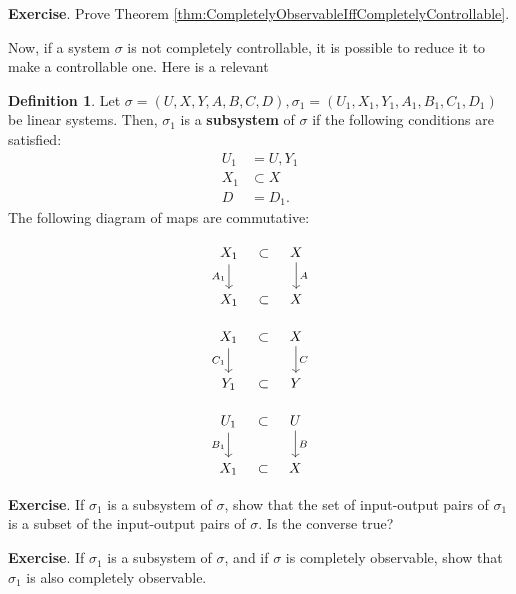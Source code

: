 \documentclass[12pt]{book}
\theoremstyle{plain}
\theoremstyle{definition}
\newtheorem{definition}{Definition}[section]
\begin{document}
\textbf{Exercise}.
Prove Theorem \ref{thm:CompletelyObservableIffCompletelyControllable}.

Now, if a system $\sigma$ is not completely controllable, it is possible to reduce it to make a controllable one.
Here is a relevant

\begin{definition}
    Let $\sigma = (U, X, Y, A, B, C, D), \sigma_1 = (U_1, X_1, Y_1, A_1, B_1, C_1, D_1)$ be linear systems.
    Then, $\sigma_1$ is a \textbf{subsystem} of $\sigma$ if the following conditions are satisfied:
    \begin{align}
        U_1 &= U, Y_1 \\
        X_1 &\subset X \\
        D &= D_1.
    \end{align}
    The following diagram of maps are commutative:
    
    \begin{equation*}
    \begin{tikzcd}[column sep=tiny]
    X_1 \ar[d,"A_1"'] & \subset & X \ar[d,"A"] \\
    X_1 & \subset & X
    \end{tikzcd}
    \end{equation*}

    \begin{equation*}
    \begin{tikzcd}[column sep=tiny]
    X_1 \ar[d,"C_1"'] & \subset & X \ar[d,"C"] \\
    Y_1 & \subset & Y
    \end{tikzcd}
    \end{equation*}

    \begin{equation*}
    \begin{tikzcd}[column sep=tiny]
    U_1 \ar[d,"B_1"'] & \subset & U \ar[d,"B"] \\
    X_1 & \subset & X
    \end{tikzcd}
    \end{equation*}
\end{definition}

\textbf{Exercise}.
If $\sigma_1$ is a subsystem of $\sigma$, show that the set of input-output pairs of $\sigma_1$ is a subset of the input-output pairs of $\sigma$.
Is the converse true?

\textbf{Exercise}.
If $\sigma_1$ is a subsystem of $\sigma$, and if $\sigma$ is completely observable, show that $\sigma_1$ is also completely observable.
\end{document}
